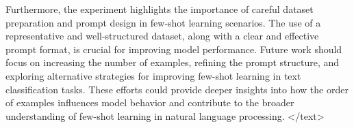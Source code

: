 \documentclass{article}
\begin{document}
Furthermore, the experiment highlights the importance of careful dataset preparation and prompt design in few-shot learning scenarios. The use of a representative and well-structured dataset, along with a clear and effective prompt format, is crucial for improving model performance. Future work should focus on increasing the number of examples, refining the prompt structure, and exploring alternative strategies for improving few-shot learning in text classification tasks. These efforts could provide deeper insights into how the order of examples influences model behavior and contribute to the broader understanding of few-shot learning in natural language processing.
</text>
\end{document}
